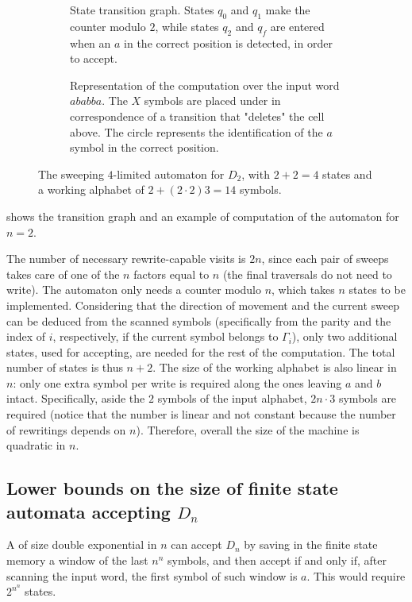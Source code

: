 \begin{figure}
	\centering
	\begin{subfigure}[b]{0.52\textwidth}
		\centering
		
		\caption{State transition graph.
			States $q_0$ and $q_1$ make the counter modulo $2$, while states $q_2$ and $q_f$ are entered when an $a$ in the correct position is detected, in order to accept.}
	\end{subfigure}
	\hfill
	\begin{subfigure}[b]{0.46\textwidth}
		\centering
		
		\caption{Representation of the computation over the input word $ababba$.
			The $X$ symbols are placed under in correspondence of a transition that "deletes" the cell above.
			The circle represents the identification of the $a$ symbol in the correct position.}
	\end{subfigure}

	\caption{The sweeping $4$-limited automaton for $D_2$, with $2+2=4$ states and a working alphabet of $2+(2\cdot2)3=14$ symbols.}
	\label{fig:sweepingDn}
\end{figure}
 shows the transition graph and an example of computation of the automaton for $n=2$.

The number of necessary rewrite-capable visits is $2n$, since each pair of sweeps takes care of one of the $n$ factors equal to $n$ (the final traversals do not need to write).
The automaton only needs a counter modulo $n$, which takes $n$ states to be implemented.
Considering that the direction of movement and the current sweep can be deduced from the scanned symbols (specifically from the parity and the index of $i$, respectively, if the current symbol belongs to $\Gamma_i$), only two additional states, used for accepting, are needed for the rest of the computation.
The total number of states is thus $n+2$.
The size of the working alphabet is also linear in $n$: only one extra symbol per write is required along the ones leaving $a$ and $b$ intact.
Specifically, aside the $2$ symbols of the input alphabet, $2n\cdot3$ symbols are required (notice that the number is linear and not constant because the number of rewritings depends on $n$).
Therefore, overall the size of the machine is quadratic in $n$.

\subsection[Size of finite state automata accepting \texorpdfstring{$D_n$}{Ln}]{Lower bounds on the size of finite state automata accepting $D_n$}
A \ODFA of size double exponential in $n$ can accept $D_n$ by saving in the finite state memory a window of the last $n^n$ symbols, and then accept if and only if, after scanning the input word, the first symbol of such window is $a$.
This would require $2^{n^n}$ states.

